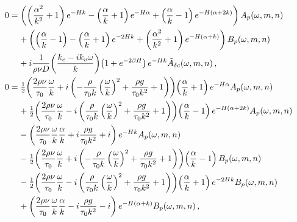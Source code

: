 \documentclass[reqno]{amsart}
\numberwithin{equation}{section}
\numberwithin{figure}{section}
\begin{document}
\begin{align*}
0
  &= \left(\left(\frac{\alpha^{2}}{k^{2}}+1\right)e^{-\aHeight k}-\left(\frac{\alpha}{k}+1\right)e^{-\aHeight\alpha}+\left(\frac{\alpha}{k}-1\right)e^{-\aHeight\left(\alpha+2k\right)}\right)A_{p}\!\left(\omega,m,n\right) \\
  &\phantom{=}\,\,+\left(\left(\frac{\alpha}{k}-1\right)-\left(\frac{\alpha}{k}+1\right)e^{-2\aHeight k}+\left(\frac{\alpha^{2}}{k^{2}}+1\right)e^{-\aHeight\left(\alpha+k\right)}\right)B_{p}\!\left(\omega,m,n\right) \\
  &\phantom{=}\,\,+i\frac{1}{\sDensity\kinematicViscousity D}\!\left(\frac{k_{e}-ik_{v}\omega}{k}\right)\!\left(1+e^{-2\beta \aHeight}\right)e^{-\aHeight k}\tilde{A}_{\delta\sBulkCo}\!\left(\omega,m,n\right), \\
0
  &= \tfrac{1}{2}\!\left(\frac{2\sDensity\kinematicViscousity}{\sTension_{0}}\frac{\omega}{k}+i\left(-\frac{\sDensity}{\sTension_{0}k}\left(\frac{\omega}{k}\right)^{2}+\frac{\sDensity g}{\sTension_{0}k^{2}}+1\right)\right)\!\left(\frac{\alpha}{k}+1\right)e^{-\aHeight\alpha}A_{p}\!\left(\omega,m,n\right) \\
  &\phantom{=}\,\,+\tfrac{1}{2}\!\left(\frac{2\sDensity\kinematicViscousity}{\sTension_{0}}\frac{\omega}{k}-i\left(\frac{\sDensity}{\sTension_{0}k}\left(\frac{\omega}{k}\right)^{2}+\frac{\sDensity g}{\sTension_{0}k^{2}}+1\right)\right)\!\left(\frac{\alpha}{k}-1\right)e^{-\aHeight\left(\alpha+2k\right)}A_{p}\!\left(\omega,m,n\right) \\
  &\phantom{=}\,\,-\left(\frac{2\sDensity\kinematicViscousity}{\sTension_{0}}\frac{\omega}{k}\frac{\alpha}{k}+i\frac{\sDensity g}{\sTension_{0}k^{2}}+i\right)e^{-\aHeight k}A_{p}\!\left(\omega,m,n\right) \\
  &\phantom{=}\,\,-\tfrac{1}{2}\!\left(\frac{2\sDensity\kinematicViscousity}{\sTension_{0}}\frac{\omega}{k}+i\left(-\frac{\sDensity}{\sTension_{0}k}\left(\frac{\omega}{k}\right)^{2}+\frac{\sDensity g}{\sTension_{0}k^{2}}+1\right)\right)\!\left(\frac{\alpha}{k}-1\right)B_{p}\!\left(\omega,m,n\right) \\
  &\phantom{=}\,\,-\tfrac{1}{2}\!\left(\frac{2\sDensity\kinematicViscousity}{\sTension_{0}}\frac{\omega}{k}-i\left(\frac{\sDensity}{\sTension_{0}k}\left(\frac{\omega}{k}\right)^{2}+\frac{\sDensity g}{\sTension_{0}k^{2}}+1\right)\right)\!\left(\frac{\alpha}{k}+1\right)e^{-2\aHeight k}B_{p}\!\left(\omega,m,n\right) \\
  &\phantom{=}\,\,+\left(\frac{2\sDensity\kinematicViscousity}{\sTension_{0}}\frac{\omega}{k}\frac{\alpha}{k}-i\frac{\sDensity g}{\sTension_{0}k^{2}}-i\right)e^{-\aHeight\left(\alpha+k\right)}B_{p}\!\left(\omega,m,n\right), \\

\end{align*}
\end{document}
